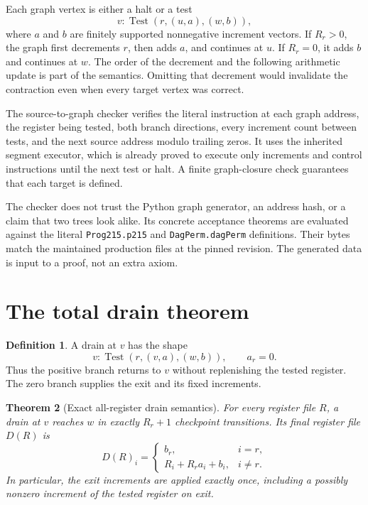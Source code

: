 \documentclass[11pt,letterpaper]{article}
\newtheorem{theorem}{Theorem}[section]
\theoremstyle{definition}\newtheorem{definition}[theorem]{Definition}
\begin{document}
Each graph vertex is either a halt or a test
\[
 v:\operatorname{Test}(r,(u,a),(w,b)),
\]
where $a$ and $b$ are finitely supported nonnegative increment vectors. If
$R_r>0$, the graph first decrements $r$, then adds $a$, and continues at $u$.
If $R_r=0$, it adds $b$ and continues at $w$. The order of the decrement and
the following arithmetic update is part of the semantics. Omitting that
decrement would invalidate the contraction even when every target vertex was
correct.

The source-to-graph checker verifies the literal instruction at each graph
address, the register being tested, both branch directions, every increment
count between tests, and the next source address modulo trailing zeros.
It uses the inherited segment executor, which is already proved to execute
only increments and control instructions until the next test or halt. A
finite graph-closure check guarantees that each target is defined.

The checker does not trust the Python graph generator, an address hash, or a
claim that two trees look alike. Its concrete acceptance theorems are evaluated
against the literal \texttt{Prog215.p215} and \texttt{DagPerm.dagPerm}
definitions. Their bytes match the maintained production files at the pinned
revision. The generated data is input to a proof, not an extra axiom.

\section{The total drain theorem}

\begin{definition}
A drain at $v$ has the shape
\[
 v:\operatorname{Test}(r,(v,a),(w,b)),\qquad a_r=0.
\]
Thus the positive branch returns to $v$ without replenishing the tested
register. The zero branch supplies the exit and its fixed increments.
\end{definition}

\begin{theorem}[Exact all-register drain semantics]\label{thm:drain}
For every register file $R$, a drain at $v$ reaches $w$ in exactly $R_r+1$
checkpoint transitions. Its final register file $D(R)$ is
\[
 D(R)_i=
 \begin{cases}
 b_r,&i=r,\\
 R_i+R_r a_i+b_i,&i\ne r.
 \end{cases}
\]
In particular, the exit increments are applied exactly once, including a
possibly nonzero increment of the tested register on exit.
\end{theorem}
\end{document}
